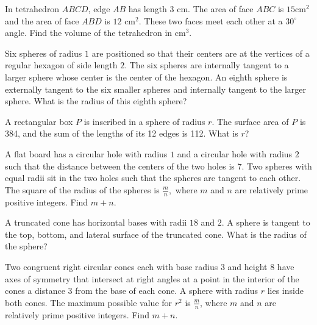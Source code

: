 \documentclass[mast]{lucky}
\begin{document}
\begin{prob}[AIME 1984/9]{2}
In tetrahedron $ABCD$, edge $AB$ has length 3 cm. The area of face $ABC$ is $15\mbox{cm}^2$ and the area of face $ABD$ is $12 \mbox { cm}^2$. These two faces meet each other at a $30^\circ$ angle. Find the volume of the tetrahedron in $\mbox{cm}^3$.
\end{prob}

\begin{prob}[AMC 10A 2013/22]{3}
Six spheres of radius $1$ are positioned so that their centers are at the vertices of a regular hexagon of side length $2$. The six spheres are internally tangent to a larger sphere whose center is the center of the hexagon. An eighth sphere is externally tangent to the six smaller spheres and internally tangent to the larger sphere. What is the radius of this eighth sphere?
\end{prob}

\begin{prob}[AMC 12A 2005/22]{3}
A rectangular box $P$ is inscribed in a sphere of radius $r$. The surface area of $P$ is 384, and the sum of the lengths of its 12 edges is 112. What is $r$?
\end{prob}

\begin{prob}[AIME I 2020/6]{3}
A flat board has a circular hole with radius $1$ and a circular hole with radius $2$ such that the distance between the centers of the two holes is $7.$ Two spheres with equal radii sit in the two holes such that the spheres are tangent to each other. The square of the radius of the spheres is $\tfrac{m}{n},$ where $m$ and $n$ are relatively prime positive integers. Find $m+n.$
\end{prob}

\begin{prob}[AMC 12B 2004/19]{3}
A truncated cone has horizontal bases with radii $18$ and $2$. A sphere is tangent to the top, bottom, and lateral surface of the truncated cone. What is the radius of the sphere?
\end{prob}

\begin{prob}[AIME II 2020/7]{4}
Two congruent right circular cones each with base radius $3$ and height $8$ have axes of symmetry that intersect at right angles at a point in the interior of the cones a distance $3$ from the base of each cone. A sphere with radius $r$ lies inside both cones. The maximum possible value for $r^2$ is $\frac mn$, where $m$ and $n$ are relatively prime positive integers. Find $m+n$.
\end{prob}
\end{document}
